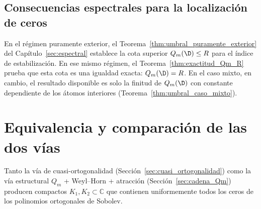\subsection{Consecuencias espectrales para la localización de ceros}

En el régimen puramente exterior, el Teorema~\ref{thm:umbral_puramente_exterior} del Capítulo~\ref{sec:espectral} establece la cota superior $Q_m(\D)\le R$ para el índice de estabilización. En ese mismo régimen, el Teorema~\ref{thm:exactitud_Qm_R} prueba que esta cota es una igualdad exacta: $Q_m(\D)=R$. En el caso mixto, en cambio, el resultado disponible es solo la finitud de $Q_m(\D)$ con constante dependiente de los átomos interiores (Teorema~\ref{thm:umbral_caso_mixto}).


\section{Equivalencia y comparación de las dos vías}\label{sec:equivalencia_vias}

\begin{prop}\label{prop:equivalencia_vias}
	Tanto la vía de cuasi-ortogonalidad (Sección~\ref{sec:cuasi_ortogonalidad}) como la vía estructural $Q_m$ + Weyl--Horn + atracción (Sección~\ref{sec:cadena_Qm}) producen compactos $K_1, K_2 \subset \mathbb{C}$ que contienen uniformemente todos los ceros de los polinomios ortogonales de Sobolev.
\end{prop}

